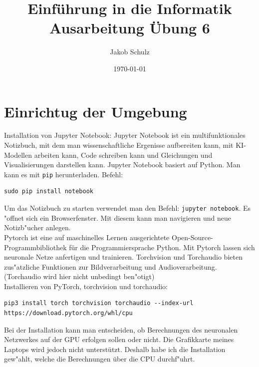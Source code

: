 \documentclass[a4paper,11pt,titlepage]{article}
\begin{document}
\title{Einf\"uhrung in die Informatik\\
Ausarbeitung \"Ubung 6}


\author{Jakob Schulz}


\date{\today}

\maketitle{\thispagestyle{plain}}
\section{Einrichtug der Umgebung}
Installation von Jupyter Notebook: Jupyter Notebook ist ein multifunktionales Notizbuch, mit dem man wissenschaftliche Ergenisse aufbereiten kann, mit KI-Modellen arbeiten kann, Code schreiben kann und Gleichungen und Visualisierungen darstellen kann.
Jupyter Notebook basiert auf Python. Man kann es mit \verb+pip+ herunterladen.
Befehl:
\begin{verbatim}
sudo pip install notebook
\end{verbatim}
Um das Notizbuch zu starten verwendet man den Befehl: \verb+jupyter notebook+. Es "offnet sich ein Browserfenster. Mit diesem kann man navigieren und neue Notizb"ucher anlegen.\\
Pytorch ist eine auf maschinelles Lernen ausgerichtete Open-Source-Programmbibliothek für die Programmiersprache Python. Mit Pytorch lassen sich neuronale Netze anfertigen und trainieren. Torchvision und Torchaudio bieten zus"atzliche Funktionen zur Bildverarbeitung und Audioverarbeitung. (Torchaudio wird hier nicht unbedingt ben"otigt)\\
Installieren von PyTorch, torchvision und torchaudio:
\begin{verbatim}
pip3 install torch torchvision torchaudio --index-url https://download.pytorch.org/whl/cpu
\end{verbatim}
Bei der Installation kann man entscheiden, ob Berechnungen des neuronalen Netzwerkes auf der GPU erfolgen sollen oder nicht. Die Grafikkarte meines Laptops wird jedoch nicht unterstützt. Deshalb habe ich die Installation gew"ahlt, welche die Berechnungen über die CPU durchf"uhrt.
\end{document}
